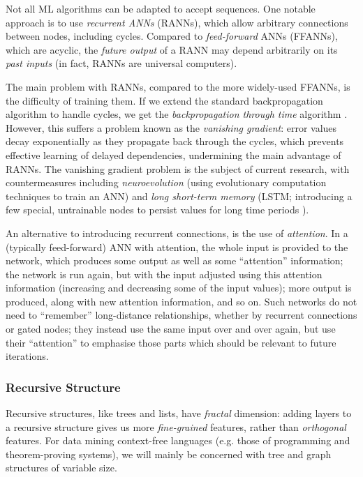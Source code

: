 Not all ML algorithms can be adapted to accept sequences. One notable approach
is to use \emph{recurrent ANNs} (RANNs), which allow arbitrary connections
between nodes, including cycles. Compared to \emph{feed-forward} ANNs (FFANNs),
which are acyclic, the \emph{future output} of a RANN may depend arbitrarily on
its \emph{past inputs} (in fact, RANNs are universal computers).

The main problem with RANNs, compared to the more widely-used FFANNs, is the
difficulty of training them. If we extend the standard backpropagation algorithm
to handle cycles, we get the \emph{backpropagation through time} algorithm
\cite{werbos1990backpropagation}. However, this suffers a problem known as the
\emph{vanishing gradient}: error values decay exponentially as they propagate
back through the cycles, which prevents effective learning of delayed
dependencies, undermining the main advantage of RANNs. The vanishing gradient
problem is the subject of current research, with countermeasures including
\emph{neuroevolution} (using evolutionary computation techniques to train an
ANN) and \emph{long short-term memory} (LSTM; introducing a few special,
untrainable nodes to persist values for long time periods
\cite{hochreiter1997long}).

An alternative to introducing recurrent connections, is the use of
\emph{attention}. %
In a (typically feed-forward) ANN with attention, the whole input is provided to
the network, which produces some output as well as some ``attention''
information; the network is run again, but with the input adjusted using this
attention information (increasing and decreasing some of the input values); more
output is produced, along with new attention information, and so on. Such
networks do not need to ``remember'' long-distance relationships, whether by
recurrent connections or gated nodes; they instead use the same input over and
over again, but use their ``attention'' to emphasise those parts which should be
relevant to future iterations.

\subsubsection{Recursive Structure}

Recursive structures, like trees and lists, have \emph{fractal} dimension:
adding layers to a recursive structure gives us more \emph{fine-grained}
features, rather than \emph{orthogonal} features. For data mining context-free
languages (e.g. those of programming and theorem-proving systems), we will
mainly be concerned with tree and graph structures of variable size.

